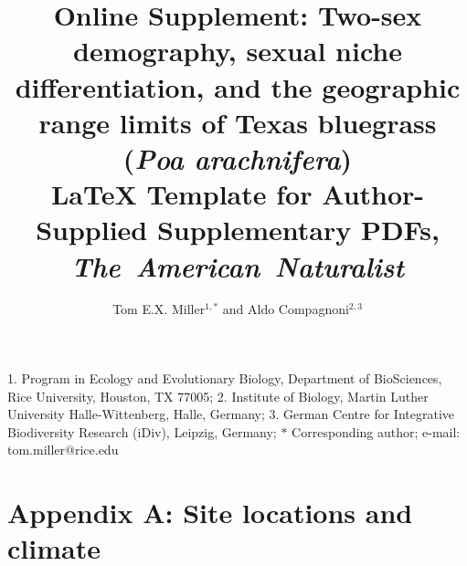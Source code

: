 \documentclass[11pt]{article}
\title{Online Supplement: Two-sex demography, sexual niche differentiation, and the geographic range limits of Texas bluegrass (\textit{Poa arachnifera})\\ 
\LaTeX{} Template for Author-Supplied Supplementary PDFs, \\ 
\textit{The~American~Naturalist} }
\author{Tom E.X. Miller$^{1,\ast}$ and Aldo Compagnoni$^{2,3}$}
\date{}
\begin{document}
	\maketitle
	\noindent{} 1. Program in Ecology and Evolutionary Biology, Department of BioSciences, Rice University, Houston, TX 77005;
	\noindent{} 2. Institute of Biology, Martin Luther University Halle-Wittenberg, Halle, Germany;
	\noindent{} 3. German Centre for Integrative Biodiversity Research (iDiv), Leipzig, Germany;
	\noindent{} $\ast$ Corresponding author; e-mail: tom.miller@rice.edu



% 
%
%

\renewcommand{\theequation}{S\arabic{equation}}
\renewcommand{\thetable}{S\arabic{table}}
\renewcommand{\thesection}{S\arabic{section}}
\renewcommand{\thefigure}{S\arabic{figure}}
\setcounter{equation}{0}  %
\setcounter{figure}{0}
\setcounter{table}{0}


\newpage{}
\section*{Appendix A: Site locations and climate}
\renewcommand{\thefigure}{A\arabic{figure}}\setcounter{figure}{0}
\renewcommand{\thetable}{A\arabic{table}}\setcounter{table}{0}
\renewcommand{\theequation}{A\arabic{equation}}\setcounter{equation}{0}
\end{document}

